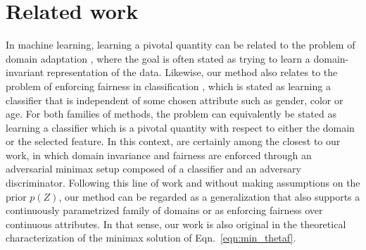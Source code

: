 \documentclass[twocolumn,superscriptaddress,aps]{revtex4-1}
\theoremstyle{plain}
\begin{document}

\section{Related work}
\label{sec:related}

In machine learning, learning a pivotal quantity can be related to the problem
of domain adaptation
\citep{blitzer2006domain,pan2011domain,gopalan2011domain,gong2013connecting,baktashmotlagh2013unsupervised,ajakan2014domain,ganin2014unsupervised},
where the goal is often stated as trying to learn a domain-invariant
representation of the data. Likewise, our method also relates to the problem of
enforcing fairness in classification \citep{zemel2013learning,feldman2015certifying,EdwardsS15,zafar2015fairness}, which
is stated as learning a classifier that is independent of some chosen attribute
such as gender, color or age. For both families of methods, the problem can
equivalently be stated as learning a classifier which is a pivotal quantity with
respect to either the domain or the selected feature. In this context,
\citep{ganin2014unsupervised,EdwardsS15} are certainly among the closest to our
work, in which domain invariance and fairness are enforced through an
adversarial minimax setup composed of a classifier and an adversary
discriminator.
Following this line of work and without making assumptions on the prior $p(Z)$, our method can be regarded as a
generalization that also supports a continuously parametrized family of domains or as enforcing fairness over continuous attributes.
In that sense, our work is also original in the theoretical characterization
of the minimax solution of Eqn.~\ref{eqn:min_thetaf}.
\end{document}
